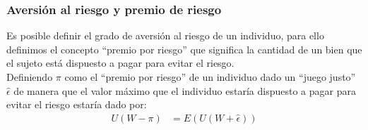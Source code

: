 \begin{frame}
    \frametitle{Aversión al riesgo y premio de riesgo}
   Es posible definir el grado de aversión al riesgo de un individuo, para ello definimos el concepto ``premio por riesgo'' que significa la cantidad de un bien que el sujeto está dispuesto a pagar para evitar el riesgo.\\
   Definiendo $\pi$ como el ``premio por riesgo'' de un individuo dado un ``juego justo'' $\hat{\epsilon}$ de manera que el valor máximo que el individuo estaría dispuesto a pagar para evitar el riesgo estaría dado por:
   \begin{align}
   U(W-\pi)&= E(U(W+\hat{\epsilon}))
   \end{align}  
   
    
\end{frame}


